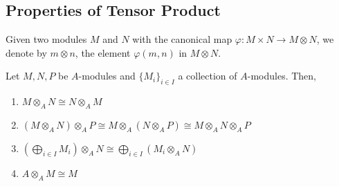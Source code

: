 \subsection*{Properties of Tensor Product}

Given two modules $M$ and $N$ with the canonical map $\varphi: M\times N\to M\otimes N$, we denote by $m\otimes n$, the element $\varphi(m,n)$ in $M\otimes N$.

\begin{proposition}
    Let $M, N, P$ be $A$-modules and $\{M_i\}_{i\in I}$ a collection of $A$-modules. Then, 
    \begin{enumerate}[label=(\alph*)]
    \item $M\otimes_A N\cong N\otimes_A M$ 
    \item $(M\otimes_A N)\otimes_A P\cong M\otimes_A(N\otimes_A P)\cong M\otimes_A N\otimes_A P$ 
    \item $\left(\bigoplus_{i\in I}M_i\right)\otimes_A N\cong\bigoplus_{i\in I}(M_i\otimes_A N)$
    \item $A\otimes_A M\cong M$
    \end{enumerate}
\end{proposition}
